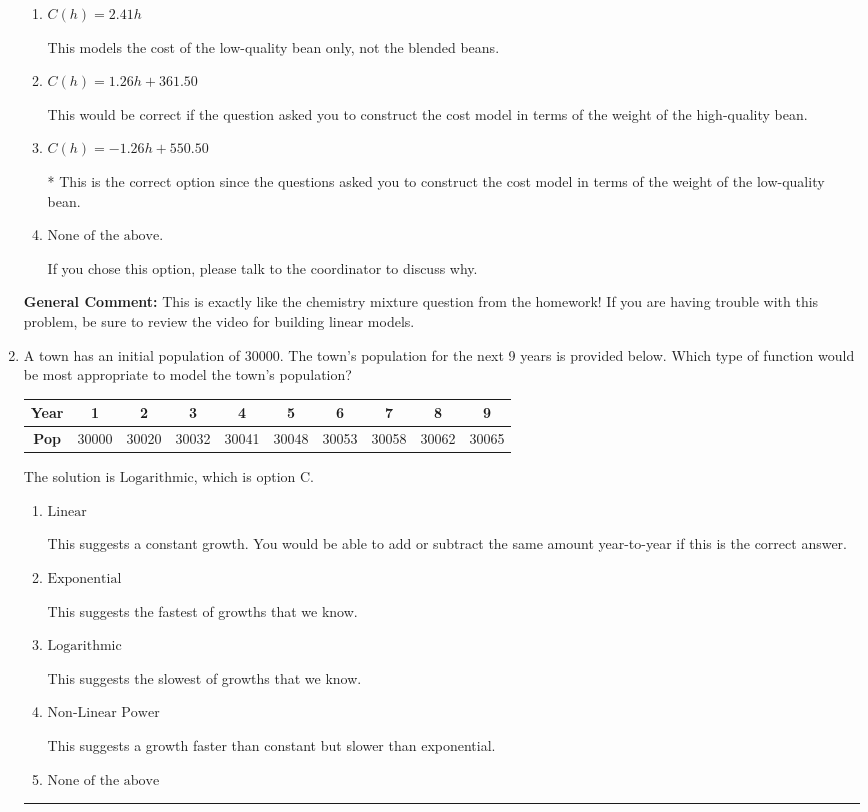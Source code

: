 \documentclass{extbook}[14pt]
\newcommand{\litem}[1]{\item #1

\rule{\textwidth}{0.4pt}}
\begin{document}
\begin{enumerate}
{\begin{enumerate}[label=\Alph*.]
This assumes that exactly half of the high- and low- quality beans are mixed to create the blended coffee beans.
\item \( C(h) = 2.41 h \)

This models the cost of the low-quality bean only, not the blended beans.
\item \( C(h) = 1.26 h + 361.50 \)

This would be correct if the question asked you to construct the cost model in terms of the weight of the high-quality bean.
\item \( C(h) = -1.26 h + 550.50 \)

* This is the correct option since the questions asked you to construct the cost model in terms of the weight of the low-quality bean.
\item \( \text{None of the above.} \)

If you chose this option, please talk to the coordinator to discuss why.
\end{enumerate}

\textbf{General Comment:} This is exactly like the chemistry mixture question from the homework! If you are having trouble with this problem, be sure to review the video for building linear models.
}
\litem{
A town has an initial population of 30000. The town's population for the next 9 years is provided below. Which type of function would be most appropriate to model the town's population?


\begin{tabular}{c|c|c|c|c|c|c|c|c|c}
\textbf{Year} &1 &2 &3 &4 &5 &6 &7 &8 &9\tabularnewline \hline
\textbf{Pop} &30000 &30020 &30032 &30041 &30048 &30053 &30058 &30062 &30065\end{tabular}The solution is \( \text{Logarithmic} \), which is option C.\begin{enumerate}[label=\Alph*.]
\item \( \text{Linear} \)

This suggests a constant growth. You would be able to add or subtract the same amount year-to-year if this is the correct answer.
\item \( \text{Exponential} \)

This suggests the fastest of growths that we know.
\item \( \text{Logarithmic} \)

This suggests the slowest of growths that we know.
\item \( \text{Non-Linear Power} \)

This suggests a growth faster than constant but slower than exponential.
\item \( \text{None of the above} \)


\end{enumerate}}
\end{enumerate}
\end{document}
